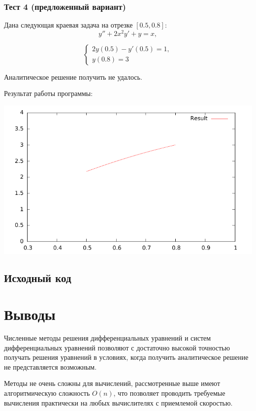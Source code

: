 \documentclass[a4paper,11pt]{report}
\begin{document}
\subsubsection*{Тест 4 (предложенный вариант)}

Дана следующая краевая задача на отрезке $[0.5, 0.8]$:
$$
y'' + 2 x^2 y' + y = x,
$$

$$
\begin{cases}
 2 y(0.5) - y'(0.5) = 1, \\
 y(0.8) = 3
\end{cases}
$$

Аналитическое решение получить не удалось.

Результат работы программы:

\includegraphics{../plots/btest4.pdf}

\subsection*{Исходный код}



\newpage

\section*{Выводы}

Численные методы решения дифференциальных уравнений и систем дифференциальных уравнений позволяют с достаточно высокой точностью
получать решения уравнений в условиях, когда получить аналитическое решение не представляется возможным.

Методы не очень сложны для вычислений, рассмотренные выше имеют алгоритмическую сложность $O(n)$, что позволяет проводить требуемые
вычисления практически на любых вычислителях с приемлемой скоростью.
\end{document}
